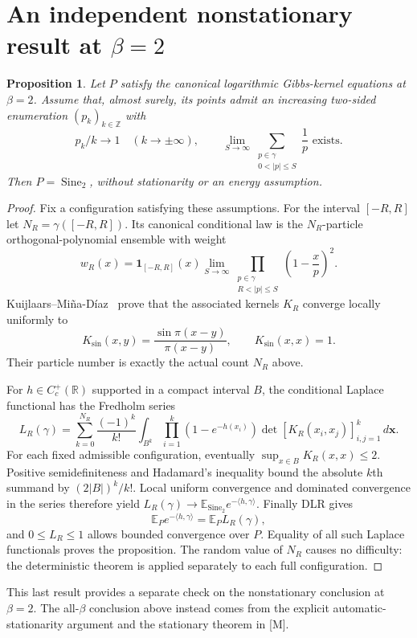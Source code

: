 \documentclass[11pt,reqno]{amsart}
\numberwithin{equation}{section}
\newtheorem{proposition}[theorem]{Proposition}
\theoremstyle{definition}
\theoremstyle{remark}
\newcommand{\R}{\mathbb R}
\newcommand{\Z}{\mathbb Z}
\newcommand{\E}{\mathbb E}
\newcommand{\1}{\mathbf1}
\newcommand{\Sine}{\operatorname{Sine}}
\newcommand{\dd}{\,d}
\begin{document}
\section{An independent nonstationary result at \texorpdfstring{$\beta=2$}{beta=2}}

\begin{proposition}\label{prop:beta2}
Let $P$ satisfy the canonical logarithmic Gibbs-kernel equations at
$\beta=2$. Assume that, almost surely, its points admit an increasing
two-sided enumeration $(p_k)_{k\in\Z}$ with
\[
p_k/k\longrightarrow1\quad(k\to\pm\infty),\qquad
\lim_{S\to\infty}\sum_{\substack{p\in\gamma\\0<|p|\le S}}\frac1p
\text{ exists}.
\]
Then $P=\Sine_2$, without stationarity or an energy assumption.
\end{proposition}

\begin{proof}
Fix a configuration satisfying these assumptions. For the interval
$[-R,R]$ let $N_R=\gamma([-R,R])$. Its canonical conditional law is
the $N_R$-particle orthogonal-polynomial ensemble with weight
\[
w_R(x)=\1_{[-R,R]}(x)
\lim_{S\to\infty}\prod_{\substack{p\in\gamma\\R<|p|\le S}}
\left(1-\frac{x}{p}\right)^2.
\]
Kuijlaars--Mi\~na-D\'iaz~\cite[Assumption 1.2 and Theorem 1.3]{KMD}
prove that the associated kernels $K_R$ converge locally uniformly to
\[
K_{\sin}(x,y)=\frac{\sin\pi(x-y)}{\pi(x-y)},\qquad K_{\sin}(x,x)=1.
\]
Their particle number is exactly the actual count $N_R$ above.

For $h\in C_c^+(\R)$ supported in a compact interval $B$, the
conditional Laplace functional has the Fredholm series
\[
L_R(\gamma)=\sum_{k=0}^{N_R}\frac{(-1)^k}{k!}
\int_{B^k}\prod_{i=1}^k(1-e^{-h(x_i)})
\det[K_R(x_i,x_j)]_{i,j=1}^k\dd\mathbf x.
\]
For each fixed admissible configuration, eventually
$\sup_{x\in B}K_R(x,x)\le2$. Positive semidefiniteness and
Hadamard's inequality bound the absolute $k$th summand by
$(2|B|)^k/k!$. Local uniform convergence and dominated convergence
in the series therefore yield
$L_R(\gamma)\to\E_{\Sine_2}e^{-\langle h,\gamma\rangle}$.
Finally DLR gives
\[
\E_Pe^{-\langle h,\gamma\rangle}=\E_PL_R(\gamma),
\]
and $0\le L_R\le1$ allows bounded convergence over $P$.
Equality of all such Laplace functionals proves the proposition.
The random value of $N_R$ causes no difficulty: the deterministic
theorem is applied separately to each full configuration.
\end{proof}

This last result provides a separate check on the nonstationary
conclusion at $\beta=2$. The all-$\beta$ conclusion above instead
comes from the explicit automatic-stationarity argument and the
stationary theorem in [M].
\end{document}
